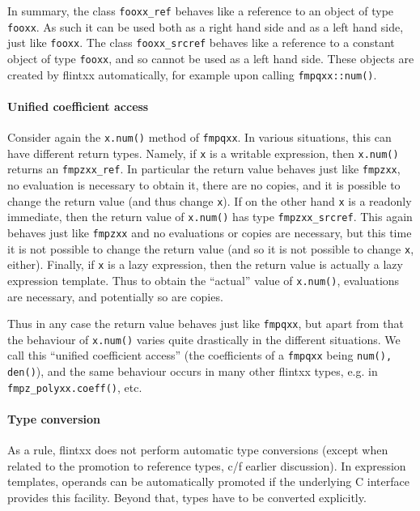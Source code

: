 \documentclass[a4paper,10pt]{book}
\newcommand{\code}{\lstinline}
\begin{document}
{{In summary, the class \code{fooxx_ref} behaves like a reference to an object of
type \code{fooxx}. As such it can be used both as a right hand side and as a
left hand side, just like \code{fooxx}. The class \code{fooxx_srcref} behaves
like a reference to a constant object of type \code{fooxx}, and so cannot be
used as a left hand side. These objects are created by flintxx automatically,
for example upon calling \code{fmpqxx::num()}.

\paragraph{Unified coefficient access}

Consider again the \code{x.num()} method of \code{fmpqxx}. In various
situations,
this can have different return types. Namely, if \code{x} is a writable
expression, then \code{x.num()} returns an \code{fmpzxx_ref}. In
particular the return value behaves just like \code{fmpzxx}, no evaluation is
necessary to obtain it, there are no copies, and it is possible to change the
return value (and thus change \code{x}). If on the other hand \code{x} is a
readonly immediate,
then the return value of \code{x.num()} has type
\code{fmpzxx_srcref}. This again behaves just like \code{fmpzxx} and no
evaluations or copies are necessary, but this time it is not possible to change
the return value (and so it is not possible to change \code{x}, either).
Finally, if \code{x} is a lazy expression, then
the return value is actually a lazy expression template. Thus to obtain the
``actual'' value of \code{x.num()}, evaluations are necessary, and potentially
so are copies.

Thus in any case the return value behaves just like \code{fmpqxx}, but apart
from that the behaviour of \code{x.num()} varies quite drastically in the
different situations. We call this ``unified coefficient access'' (the
coefficients of a \code{fmpqxx} being \code{num(), den()}), and the same
behaviour occurs in many other flintxx types, e.g. in
\code{fmpz_polyxx.coeff()}, etc.

\paragraph{Type conversion}

As a rule, flintxx does not perform automatic type conversions (except when
related to the promotion to reference types, c/f earlier discussion). In
expression templates, operands can be automatically promoted if the underlying
C interface provides this facility. Beyond that, types have to be converted
explicitly.

}}
\end{document}
